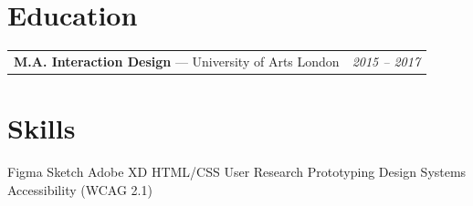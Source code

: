 \documentclass[10pt,a4paper]{article}
\begin{document}
\section{Education}

\noindent
\begin{tabularx}{\textwidth}{@{}X r@{}}
    \textbf{M.A. Interaction Design} --- University of Arts London & \textit{2015 -- 2017}
\end{tabularx}

\section{Skills}
Figma \quad Sketch \quad Adobe XD \quad HTML/CSS \quad User Research \quad
Prototyping \quad Design Systems \quad Accessibility (WCAG 2.1)
\end{document}
